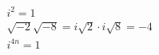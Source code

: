 \documentclass[preview]{standalone}
\begin{document}
\begin{align*}
&i^2 = 1 \\ &\sqrt{-2}\sqrt{-8} = i\sqrt{2} \cdot i\sqrt{8} = -4 \\ &i^{4n} = 1
\end{align*}
\end{document}
